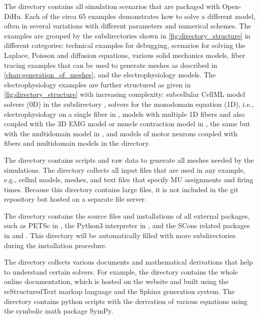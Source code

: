 The  directory contains all simulation scenarios that are packaged with Open-\break DiHu. Each of the circa 65 examples demonstrates how to solve a different model, often in several variations with different parameters and numerical schemes. 
The examples are grouped by the subdirectories shown in \cref{fig:directory_structure} in different categories: technical examples for debugging, scenarios for solving the Laplace, Poisson and diffusion equations, various solid mechanics models, fiber tracing examples that can be used to generate meshes as described in \cref{chap:generation_of_meshes}, and the electrophysiology models. 
The electrophysiology examples are further structured as given in \cref{fig:directory_structure} with increasing complexity: 
subcellular CellML model solvers (0D) in the subdirectory , 
solvers for the monodomain equation (1D), i.e., electrophysiology on a single fiber in , 
models with multiple 1D fibers and also coupled with the 3D EMG model or muscle contraction model in , 
the same but with the multidomain model in , 
and models of motor neurons coupled with fibers and multidomain models in the  directory. 

The directory  contains scripts and raw data to generate all meshes needed by the simulations. The directory  collects all input files that are used in any example, e.g., cellml models, meshes, and text files that specify MU assignments and firing times. Because this directory contains large files, it is not included in the git repository but hosted on a separate file server.

The  directory contains the source files and installations of all external packages, such as PETSc in , the Python3 interpreter in , and the SCons related packages in  and . This directory will be automatically filled with more subdirectories during the installation procedure.

The  directory collects various documents and mathematical derivations that help to understand certain solvers. For example, the directory  contains the whole online documentation, which is hosted on the  website \cite{opendihuWeb} and built using the reStructuredText markup language and the Sphinx generation system. The  directory contains python scripts with the derivation of various equations using the symbolic math package SymPy.

